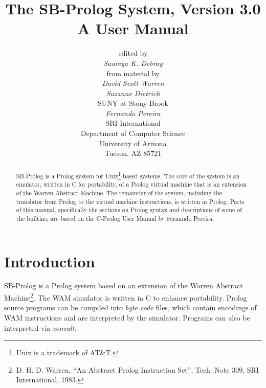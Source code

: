 
\newcommand{\bold}[1]{{\bf #1}}
\newcommand{\see}[2]{{\em see\/} #1}

\renewcommand{\today}{September 1988}
\makepredindex
\makeindex

\title{
The SB-Prolog System, Version 3.0 \\[3ex]
A User Manual}
\author{edited by \\
{\em Saumya K. Debray} \\[2ex]
from material by \\[2ex]
{\em David Scott Warren} \\
{\em Suzanne Dietrich} \\
SUNY at Stony Brook \\[2ex]
{\em Fernando Pereira} \\
SRI International \\[5ex]
Department of Computer Science \\
University of Arizona \\
Tucson, AZ 85721}
\maketitle
\newpage
\tableofcontents
\listoffigures
\listoftables
\newpage
\begin{abstract}
SB-Prolog is a Prolog system for Unix\footnote{
Unix is a trademark of AT\&T.}-based systems.
The core of the system is an emulator, written in C for portability, of a
Prolog virtual machine that is an extension of the Warren Abstract Machine.
The remainder of the system, including the translator from
Prolog to the virtual machine instructions, is written in Prolog.
Parts of this manual,
specifically the sections on Prolog syntax and descriptions of some
of the builtins, are based on the C-Prolog User Manual by Fernando Pereira.
\end{abstract}

\section{Introduction}
SB-Prolog is a Prolog system based on an extension of the Warren
Abstract Machine\footnote{
D. H. D. Warren, ``An Abstract Prolog Instruction Set'',
Tech. Note 309, SRI International, 1983.}.
The WAM simulator is written in C to enhance portability.
Prolog source programs can be compiled into {\em byte code} files,
which contain encodings of WAM instructions and are
interpreted by the simulator.
Programs can also be interpreted via {\em consult}.

